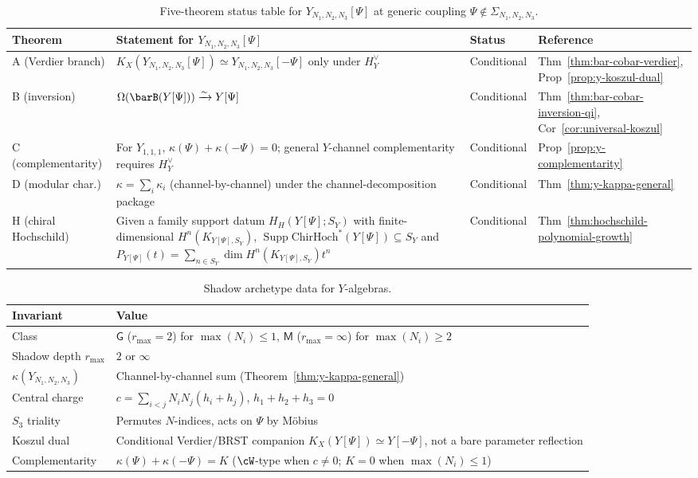 \begin{table}[ht]
\centering
\small
\caption{Five-theorem status table for $Y_{N_1,N_2,N_3}[\Psi]$
at generic coupling $\Psi \notin \Sigma_{N_1,N_2,N_3}$.}%
\label{tab:y-five-theorems}
\begin{tabular}{llll}
\toprule
\textbf{Theorem} & \textbf{Statement for $Y_{N_1,N_2,N_3}[\Psi]$}
 & \textbf{Status} & \textbf{Reference} \\
\midrule
A (Verdier branch) &
 \(K_X(Y_{N_1,N_2,N_3}[\Psi])\simeq
 Y_{N_1,N_2,N_3}[-\Psi]\) only under \(H_Y^\vee\)
 & Conditional & Thm~\ref{thm:bar-cobar-verdier},
 Prop~\ref{prop:y-koszul-dual} \\
B (inversion) &
 $\Omega(\barB(Y[\Psi])) \xrightarrow{\sim}
 Y[\Psi]$
 & Conditional & Thm~\ref{thm:bar-cobar-inversion-qi},
 Cor~\ref{cor:universal-koszul} \\
C (complementarity) &
 For \(Y_{1,1,1}\),
 \(\kappa(\Psi)+\kappa(-\Psi)=0\); general \(Y\)-channel
 complementarity requires \(H_Y^\vee\)
 & Conditional & Prop~\ref{prop:y-complementarity} \\
D (modular char.) &
 $\kappa = \sum_i \kappa_i$ (channel-by-channel) under the
 channel-decomposition package
 & Conditional & Thm~\ref{thm:y-kappa-general} \\
H (chiral Hochschild) &
 Given a family support datum \(H_H(Y[\Psi];S_Y)\) with
 finite-dimensional \(H^n(K_{Y[\Psi],S_Y})\),
 $\operatorname{Supp}\mathrm{ChirHoch}^*(Y[\Psi])\subseteq S_Y$
 and
 $P_{Y[\Psi]}(t)=\sum_{n\in S_Y}\dim H^n(K_{Y[\Psi],S_Y})t^n$
 & Conditional & Thm~\ref{thm:hochschild-polynomial-growth} \\
\bottomrule
\end{tabular}
\end{table}

\begin{table}[ht]
\centering
\small
\caption{Shadow archetype data for $Y$-algebras.}%
\label{tab:y-shadow-archetype}
\begin{tabular}{ll}
\toprule
\textbf{Invariant} & \textbf{Value} \\
\midrule
Class & $\mathsf{G}$ ($r_{\max} = 2$) for $\max(N_i) \leq 1$, \;
 $\mathsf{M}$ ($r_{\max} = \infty$) for $\max(N_i) \geq 2$ \\
Shadow depth $r_{\max}$ & $2$ or $\infty$ \\
$\kappa(Y_{N_1,N_2,N_3})$ &
 Channel-by-channel sum
 (Theorem~\ref{thm:y-kappa-general}) \\
Central charge & $c = \sum_{i<j} N_i N_j (h_i + h_j)$, \;
 $h_1 + h_2 + h_3 = 0$ \\
$S_3$ triality & Permutes $N$-indices, acts on
 $\Psi$ by M\"obius \\
Koszul dual & Conditional Verdier/BRST companion
 \(K_X(Y[\Psi])\simeq Y[-\Psi]\), not a bare
 parameter reflection \\
Complementarity & $\kappa(\Psi) + \kappa(-\Psi) = K$
 ($\cW$-type when $c \neq 0$; $K=0$
 when $\max(N_i) \leq 1$) \\
\bottomrule
\end{tabular}
\end{table}


